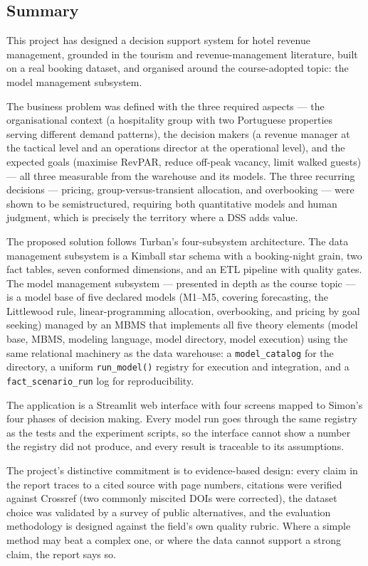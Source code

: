 \subsection{Summary}

This project has designed a decision support system for hotel revenue management, grounded in the tourism and revenue-management literature, built on a real booking dataset, and organised around the course-adopted topic: the model management subsystem.

The business problem was defined with the three required aspects --- the organisational context (a hospitality group with two Portuguese properties serving different demand patterns), the decision makers (a revenue manager at the tactical level and an operations director at the operational level), and the expected goals (maximise RevPAR, reduce off-peak vacancy, limit walked guests) --- all three measurable from the warehouse and its models. The three recurring decisions --- pricing, group-versus-transient allocation, and overbooking --- were shown to be semistructured, requiring both quantitative models and human judgment, which is precisely the territory where a DSS adds value.

The proposed solution follows Turban's four-subsystem architecture. The data management subsystem is a Kimball star schema with a booking-night grain, two fact tables, seven conformed dimensions, and an ETL pipeline with quality gates. The model management subsystem --- presented in depth as the course topic --- is a model base of five declared models (M1--M5, covering forecasting, the Littlewood rule, linear-programming allocation, overbooking, and pricing by goal seeking) managed by an MBMS that implements all five theory elements (model base, MBMS, modeling language, model directory, model execution) using the same relational machinery as the data warehouse: a \texttt{model\_catalog} for the directory, a uniform \texttt{run\_model()} registry for execution and integration, and a \texttt{fact\_scenario\_run} log for reproducibility.

The application is a Streamlit web interface with four screens mapped to Simon's four phases of decision making. Every model run goes through the same registry as the tests and the experiment scripts, so the interface cannot show a number the registry did not produce, and every result is traceable to its assumptions.

The project's distinctive commitment is to evidence-based design: every claim in the report traces to a cited source with page numbers, citations were verified against Crossref (two commonly miscited DOIs were corrected), the dataset choice was validated by a survey of public alternatives, and the evaluation methodology is designed against the field's own quality rubric. Where a simple method may beat a complex one, or where the data cannot support a strong claim, the report says so.
